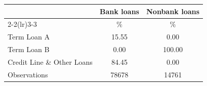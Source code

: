 {
\def\sym#1{\ifmmode^{#1}\else\(^{#1}\)\fi}
\begin{tabular}{l*{2}{c}}
\hline\hline
                    &\multicolumn{1}{c}{Bank loans}                              &\multicolumn{1}{c}{Nonbank loans}                           \\\cmidrule(lr){2-2}\cmidrule(lr){3-3}
                    &                                                          \%&                                                          \%\\
\hline
Term Loan A         &                                                       15.55&                                                        0.00\\
Term Loan B         &                                                        0.00&                                                      100.00\\
Credit Line \& Other Loans&                                                       84.45&                                                        0.00\\
\hline
Observations        &                                                       78678&                                                       14761\\
\hline\hline
\end{tabular}
}
